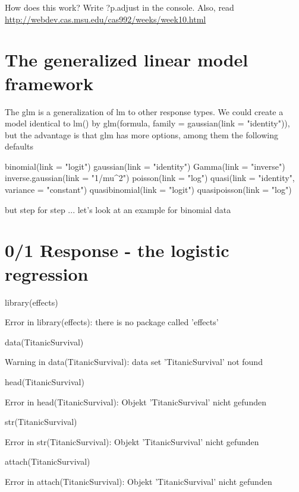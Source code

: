 \documentclass[a4paper,twoside]{tufte-book}\usepackage[]{graphicx}\usepackage[]{color}
\begin{document}
\begin{Anhang}
How does this work? Write ?p.adjust in the console. Also, read \href{this}{http://webdev.cas.msu.edu/cas992/weeks/week10.html}

\section{The generalized linear model framework}

The glm is a generalization of lm to other response types. We could create a model identical to lm() by glm(formula, family = gaussian(link = "identity")), but the advantage is that glm has more options, among them the following defaults

\begin{Schunk}
\begin{Sinput}
binomial(link = "logit")
gaussian(link = "identity")
Gamma(link = "inverse")
inverse.gaussian(link = "1/mu^2")
poisson(link = "log")
quasi(link = "identity", variance = "constant")
quasibinomial(link = "logit")
quasipoisson(link = "log")
\end{Sinput}
\end{Schunk}

but step for step ... let's look at an example for binomial data


\section{0/1 Response - the logistic regression}

\begin{Schunk}
\begin{Sinput}
library(effects) 
\end{Sinput}
\begin{Soutput}
Error in library(effects): there is no package called 'effects'
\end{Soutput}
\begin{Sinput}
data(TitanicSurvival)
\end{Sinput}
\begin{Soutput}
Warning in data(TitanicSurvival): data set 'TitanicSurvival' not found
\end{Soutput}
\begin{Sinput}
head(TitanicSurvival)
\end{Sinput}
\begin{Soutput}
Error in head(TitanicSurvival): Objekt 'TitanicSurvival' nicht gefunden
\end{Soutput}
\begin{Sinput}
str(TitanicSurvival)
\end{Sinput}
\begin{Soutput}
Error in str(TitanicSurvival): Objekt 'TitanicSurvival' nicht gefunden
\end{Soutput}
\begin{Sinput}
attach(TitanicSurvival)
\end{Sinput}
\begin{Soutput}
Error in attach(TitanicSurvival): Objekt 'TitanicSurvival' nicht gefunden
\end{Soutput}
\end{Schunk}


\end{Anhang}
\end{document}
